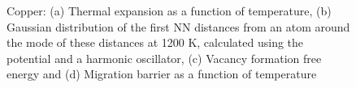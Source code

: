 \documentclass{article}
\begin{document}
\begin{figure}[!htp]
\centering
{}
\hfill
{}
\hfill
\caption{Copper: (a) Thermal expansion as a function of temperature, (b) Gaussian distribution of the first NN distances from an atom around the mode of these distances at 1200 K, calculated using the potential \cite{Mendelev2008} and a harmonic oscillator, (c) Vacancy formation free energy and (d) Migration barrier as a function of temperature}
\label{fig:13}
\end{figure}
\end{document}
